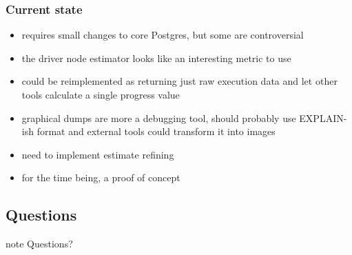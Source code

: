 \documentclass{beamer}
\begin{document}
\begin{frame}
  \frametitle{Current state}

  \begin{itemize}
  \item requires small changes to core Postgres, but some are controversial
  \item the driver node estimator looks like an interesting metric to use
  \item could be reimplemented as returning just raw execution data and let
    other tools calculate a single progress value
  \item graphical dumps are more a debugging tool, should probably use
    EXPLAIN-ish format and external tools could transform it into images
  \item need to implement estimate refining
  \item for the time being, a proof of concept
  \end{itemize}
\end{frame}

\subsection*{Questions}

\begin{frame}
\begin{beamercolorbox}[center]{note}
  \Huge Questions?
\end{beamercolorbox}
\end{frame}
\end{document}
